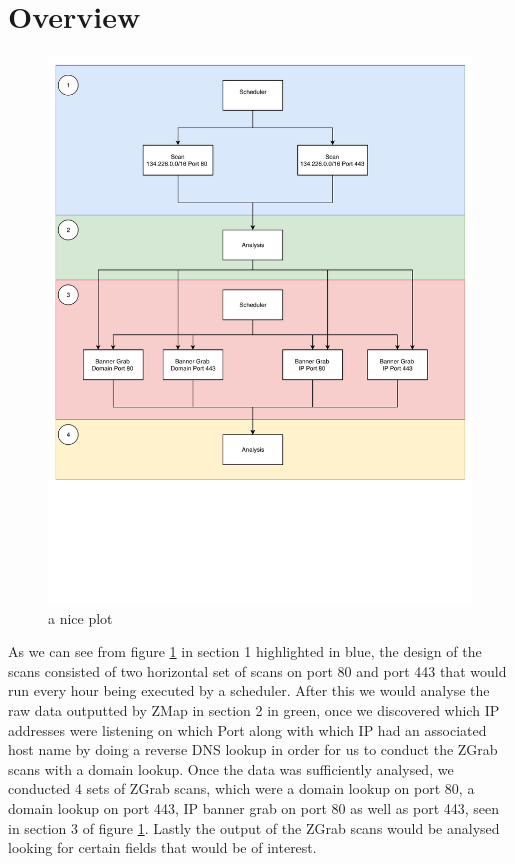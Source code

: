 \documentclass[a4wide,leqno,12pt]{report}
\begin{document}
\section{Overview}
\begin{figure}[h!]
\centering
\includegraphics[scale=.5]{pdf_images/design}
\caption{a nice plot}
\label{fig:design}
\end{figure}

As we can see from figure \ref{fig:design} in section 1 highlighted in blue,
the design of the scans consisted of two horizontal set of scans on port 80 and port 443 that would run every hour being executed by a scheduler. After this we would analyse the raw data outputted by ZMap in section 2 in green, once we discovered which IP addresses were listening on which Port along with which IP had an associated host name by doing a reverse DNS lookup in order for us to conduct the ZGrab scans with a domain lookup. Once the data was sufficiently analysed, we conducted 4 sets of ZGrab scans, which were a domain lookup on port 80, a domain lookup on port 443, IP banner grab on port 80 as well as port 443, seen in section 3 of figure \ref{fig:design}. Lastly the output of the ZGrab scans would be analysed looking for certain fields that would be of interest.
\end{document}
